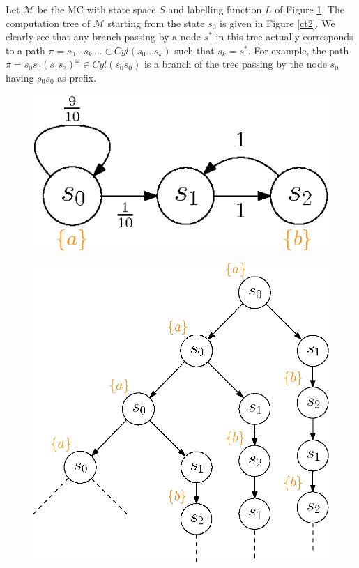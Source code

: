 \begin{example}
Let $\mathcal{M}$ be the MC with state space $S$ and labelling function $L$ of Figure \ref{ct1}. The computation tree of $\mathcal{M}$ starting from the state $s_0$ is
given in Figure \ref{ct2}.
We clearly see that any branch passing by a node $s^*$ in this tree actually corresponds to a path $\pi = s_0 \dots s_k {\, \dots} \in Cyl(s_0 \dots s_k)$ such that $s_k=s^*$.
For example,
the path $\pi = s_0s_0(s_1s_2)^\omega \in Cyl(s_0s_0)$ is a branch of the tree passing by the node $s_0$ having $s_0s_0$ as prefix.
\begin{figure}[h]
  \begin{minipage}{0.4\linewidth}
    \centering
    \includegraphics[width=0.8\linewidth]{resources/CLT_unfolding_1}
    \captionsetup{justification=centering}
    \label{ct1}
  \end{minipage}
  \begin{minipage}{0.6\linewidth}
    \centering
    \includegraphics[width=0.8\linewidth]{resources/CLT_unfolding_2}

\end{minipage}
\end{figure}
\end{example}
